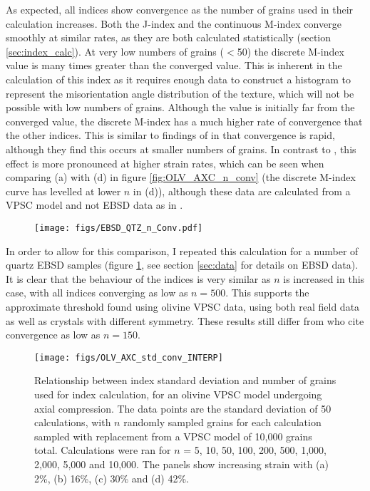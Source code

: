 \documentclass[a4paper,12pt,twoside]{report}
\numberwithin{equation}{chapter}
\begin{document}
As expected, all indices show convergence as the number of grains used in their calculation increases. Both the J-index and the continuous M-index converge smoothly at similar rates, as they are both calculated statistically (section \ref{sec:index_calc}). At very low numbers of grains ($<$50) the discrete M-index value is many times greater than the converged value. This is inherent in the calculation of this index as it requires enough data to construct a histogram to represent the misorientation angle distribution of the texture, which will not be possible with low numbers of grains. Although the value is initially far from the converged value, the discrete M-index has a much higher rate of convergence that the other indices. This is similar to findings of \cite{Skemer} in that convergence is rapid, although they find this occurs at smaller numbers of grains. In contrast to \cite{Skemer}, this effect is more pronounced at higher strain rates, which can be seen when comparing (a) with (d) in figure \ref{fig:OLV_AXC_n_conv} (the discrete M-index curve has levelled at lower $n$ in (d)), although these data are calculated from a VPSC model and not EBSD data as in \cite{Skemer}.

\begin{figure}[t!]
  \centering
    \texttt{[image: figs/EBSD\_QTZ\_n\_Conv.pdf]}
  \caption[Convergence with no. of grains (quartz EBSD)]{}
  \label{fig:EBSD_QTZ_n_conv}
\end{figure}

In order to allow for this comparison, I repeated this calculation for a number of quartz EBSD samples (figure \ref{fig:EBSD_QTZ_n_conv}, see section \ref{sec:data} for details on EBSD data). It is clear that the behaviour of the indices is very similar as $n$ is increased in this case, with all indices converging as low as $n = 500$. This supports the approximate threshold found using olivine VPSC data, using both real field data as well as crystals with  different symmetry. These results still differ from \cite{Skemer} who cite convergence as low as $n = 150$. 

      
\begin{figure}[h!]
  \centering
    \texttt{[image: figs/OLV\_AXC\_std\_conv\_INTERP]}
  \caption[Index error with no. grains (olivine)]{Relationship between index standard deviation and number of grains used for index calculation, for an olivine VPSC model undergoing axial compression. The data points are the standard deviation of 50 calculations, with $n$ randomly sampled grains for each calculation sampled with replacement from a VPSC model of 10,000 grains total. Calculations were ran for $n$ = 5, 10, 50, 100, 200, 500, 1,000, 2,000, 5,000 and 10,000. The panels show increasing strain with (a) 2\%, (b) 16\%, (c) 30\% and (d) 42\%. }
  \label{fig:OLV_AXC_n_conv_err}
\end{figure}
\end{document}

